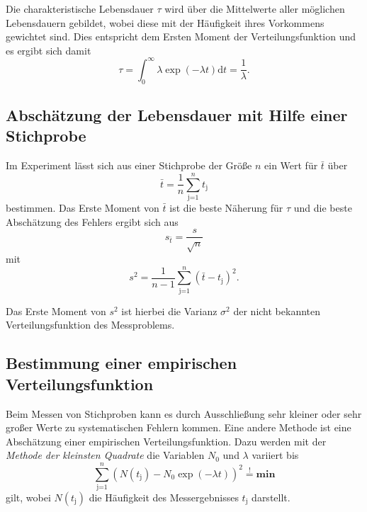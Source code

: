 Die charakteristische Lebensdauer $\tau$ wird über die Mittelwerte aller möglichen Lebensdauern gebildet, wobei diese mit der Häufigkeit ihres Vorkommens gewichtet sind.
Dies entspricht dem Ersten Moment der Verteilungsfunktion und es ergibt sich damit
\begin{equation}
	\tau = \int_\text{0}^\infty \lambda \exp{(-\lambda t)} \text{d}t = \frac{1}{\lambda} .
\end{equation}
\FloatBarrier
\subsection{Abschätzung der Lebensdauer mit Hilfe einer Stichprobe} %
\label{sub:abschaetzung_der_lebensdauer_mit_hilfe_einer_stichprobe}

Im Experiment lässt sich aus einer Stichprobe der Größe $n$ ein Wert für $\bar{t}$ über
\begin{equation}
	\bar{t} = \frac{1}{n} \sum_{\text{j=1}}^n t_\text{j}
\end{equation}
bestimmen.
Das Erste Moment von $\bar{t}$ ist die beste Näherung für $\tau$ und die beste Abschätzung des Fehlers ergibt sich aus
\begin{equation}
	s_{\bar{t}} = \frac{s}{\sqrt{n}}
\end{equation}
mit
\begin{equation}
	s^2 = \frac{1}{n-1} \sum_\text{j=1}^n \left(\bar{t} - t_\text{j}\right)^2 .
\end{equation}

Das Erste Moment von $s^2$ ist hierbei die Varianz $\sigma^2$ der nicht bekannten Verteilungsfunktion des Messproblems.
\FloatBarrier
\subsection{Bestimmung einer empirischen Verteilungsfunktion} %
\label{sub:bestimmung_einer_empirischen_verteilungsfunktion}


Beim Messen von Stichproben kann es durch Ausschließung sehr kleiner oder sehr großer Werte zu systematischen Fehlern kommen.
Eine andere Methode ist eine Abschätzung einer empirischen Verteilungsfunktion.
Dazu werden mit der \textit{Methode der kleinsten Quadrate} die Variablen $N_\text{0}$ und $\lambda$ variiert bis
\begin{equation}
	\sum_\text{j=1}^n \left(N(t_\text{j})-N_\text{0}\exp{(-\lambda t)}\right)^2 \stackrel{!}{=} \textbf{min}
\end{equation}
gilt, wobei $N(t_\text{j})$ die Häufigkeit des Messergebnisses $t_\text{j}$ darstellt.

